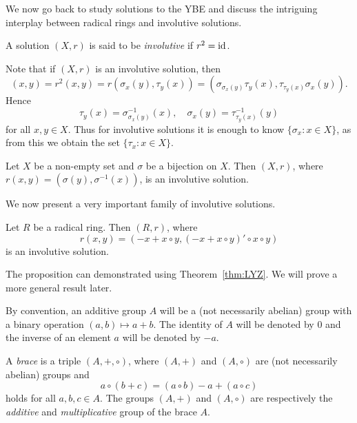 We now go back to study solutions to the YBE and discuss the intriguing interplay
between radical rings and involutive solutions. 

\begin{definition}
	A solution $(X,r)$ is said to be \emph{involutive} if $r^2=\operatorname{id}$. 
\end{definition}

Note that if $(X,r)$ is an  involutive solution, then 
\[
(x,y)=r^2(x,y)=r(\sigma_x(y),\tau_y(x))=(\sigma_{\sigma_x(y)}\tau_y(x),\tau_{\tau_y(x)}\sigma_x(y)).
\]
Hence 
\begin{equation}
	\label{eq:involutive}
	\tau_y(x)=\sigma_{\sigma_x(y)}^{-1}(x),
	\quad
	\sigma_x(y)=\tau_{\tau_y(x)}^{-1}(y)
\end{equation}
for all $x,y\in X$. Thus for involutive solutions
it is enough to know $\{\sigma_x:x\in X\}$, as from this we obtain the
set $\{\tau_x:x\in X\}$.

\begin{example}
	Let $X$ be a non-empty set and $\sigma$ be a bijection on $X$. Then 
	$(X,r)$, where $r(x,y)=(\sigma(y),\sigma^{-1}(x))$, is an involutive solution. 
\end{example}

We now present a very important family of involutive solutions. 

\begin{theorem}[Rump]
	\label{thm:Rump}
	Let $R$ be a radical ring. Then $(R,r)$, where 
	\[
	r(x,y)=( -x+x\circ y,(-x+x\circ y)'\circ x\circ y)
	\]
	is an involutive solution.
\end{theorem}

The proposition can demonstrated using Theorem~\ref{thm:LYZ}. We will
prove a more general result later. 


By convention, an additive group $A$ will be a (not necessarily abelian) group 
with a binary operation $(a,b)\mapsto a+b$. The 
identity of $A$ will be denoted by $0$ 
and the inverse of an element $a$ will be denoted by $-a$. 

\begin{definition}
	A \emph{brace} is a triple $(A,+,\circ)$, where $(A,+)$ and $(A,\circ)$ 
	are (not necessarily abelian) 
	groups and 
	\begin{equation}
	    \label{eq:compatibility}
	    a\circ(b+c)=(a\circ b)-a+(a\circ c)
	\end{equation}
	holds for all $a,b,c\in A$. The groups 
	$(A,+)$ and $(A,\circ)$ are respectively 
	the \emph{additive} and \emph{multiplicative} group
	of the brace $A$.
\end{definition}

